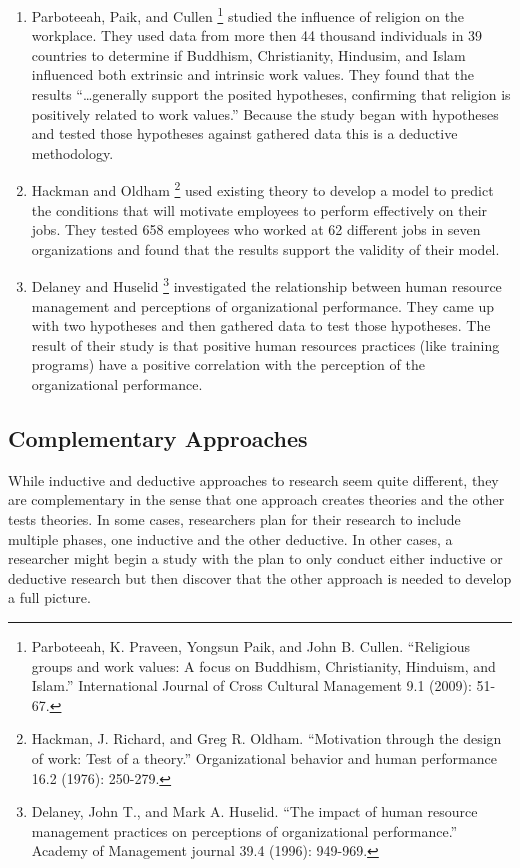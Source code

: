 \documentclass[]{book}
\let\rmarkdownfootnote\footnote%
\def\footnote{\protect\rmarkdownfootnote}
\theoremstyle{definition}
\theoremstyle{definition}
\theoremstyle{definition}
\theoremstyle{remark}
\begin{document}
\begin{enumerate}
\def\labelenumi{\arabic{enumi}.}
\item
  Parboteeah, Paik, and Cullen \footnote{Parboteeah, K. Praveen, Yongsun
    Paik, and John B. Cullen. ``Religious groups and work values: A
    focus on Buddhism, Christianity, Hinduism, and Islam.''
    International Journal of Cross Cultural Management 9.1 (2009):
    51-67.} studied the influence of religion on the workplace. They
  used data from more then 44 thousand individuals in 39 countries to
  determine if Buddhism, Christianity, Hindusim, and Islam influenced
  both extrinsic and intrinsic work values. They found that the results
  ``\ldots{}generally support the posited hypotheses, confirming that
  religion is positively related to work values.'' Because the study
  began with hypotheses and tested those hypotheses against gathered
  data this is a deductive methodology.
\item
  Hackman and Oldham \footnote{Hackman, J. Richard, and Greg R. Oldham.
    ``Motivation through the design of work: Test of a theory.''
    Organizational behavior and human performance 16.2 (1976): 250-279.}
  used existing theory to develop a model to predict the conditions that
  will motivate employees to perform effectively on their jobs. They
  tested 658 employees who worked at 62 different jobs in seven
  organizations and found that the results support the validity of their
  model.
\item
  Delaney and Huselid \footnote{Delaney, John T., and Mark A. Huselid.
    ``The impact of human resource management practices on perceptions
    of organizational performance.'' Academy of Management journal 39.4
    (1996): 949-969.} investigated the relationship between human
  resource management and perceptions of organizational performance.
  They came up with two hypotheses and then gathered data to test those
  hypotheses. The result of their study is that positive human resources
  practices (like training programs) have a positive correlation with
  the perception of the organizational performance.
\end{enumerate}

\hypertarget{complementary-approaches}{%
\subsection{Complementary Approaches}\label{complementary-approaches}}

While inductive and deductive approaches to research seem quite
different, they are complementary in the sense that one approach creates
theories and the other tests theories. In some cases, researchers plan
for their research to include multiple phases, one inductive and the
other deductive. In other cases, a researcher might begin a study with
the plan to only conduct either inductive or deductive research but then
discover that the other approach is needed to develop a full picture.
\end{document}
